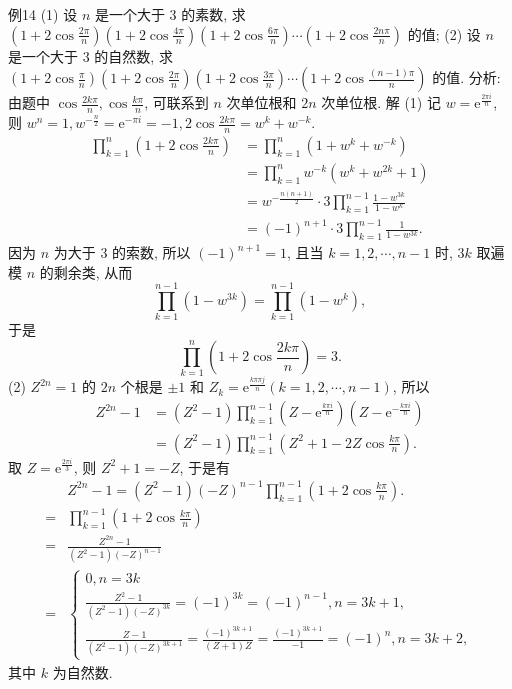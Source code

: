 例14 (1) 设 $n$ 是一个大于 3 的素数, 求 $\left(1+2 \cos \frac{2 \pi}{n}\right)\left(1+2 \cos \frac{4 \pi}{n}\right)\left(1+ 2 \cos \frac{6 \pi}{n}\right) \cdots\left(1+2 \cos \frac{2 n \pi}{n}\right)$ 的值;
(2) 设 $n$ 是一个大于 3 的自然数, 求 $\left(1+2 \cos \frac{\pi}{n}\right)\left(1+2 \cos \frac{2 \pi}{n}\right)\left(1+ 2 \cos \frac{3 \pi}{n}\right) \cdots\left(1+2 \cos \frac{(n-1) \pi}{n}\right)$ 的值.
分析:由题中 $\cos \frac{2 k \pi}{n}, \cos \frac{k \pi}{n}$, 可联系到 $n$ 次单位根和 $2 n$ 次单位根.
解 (1) 记 $w=\mathrm{e}^{\frac{2 \pi i}{n}}$, 则 $w^n=1, w^{-\frac{n}{2}}=\mathrm{e}^{-\pi i}=-1,2 \cos \frac{2 k \pi}{n}=w^k+w^{-k}$.
$$
\begin{aligned}
\prod_{k=1}^n\left(1+2 \cos \frac{2 k \pi}{n}\right) & =\prod_{k=1}^n\left(1+w^k+w^{-k}\right) \\
& =\prod_{k=1}^n w^{-k}\left(w^k+w^{2 k}+1\right) \\
& =w^{-\frac{n(n+1)}{2}} \cdot 3 \prod_{k=1}^{n-1} \frac{1-w^{3 k}}{1-w^k} \\
& =(-1)^{n+1} \cdot 3 \prod_{k=1}^{n-1} \frac{1}{1-w^{3 k}} .
\end{aligned}
$$
因为 $n$ 为大于 3 的索数, 所以 $(-1)^{n+1}=1$, 且当 $k=1,2, \cdots, n-1$ 时, $3 k$ 取遍模 $n$ 的剩余类, 从而
$$
\prod_{k=1}^{n-1}\left(1-w^{3 k}\right)=\prod_{k=1}^{n-1}\left(1-w^k\right),
$$
于是
$$
\prod_{k=1}^n\left(1+2 \cos \frac{2 k \pi}{n}\right)=3 .
$$
(2) $Z^{2 n}=1$ 的 $2 n$ 个根是 $\pm 1$ 和 $Z_k=\mathrm{e}^{\frac{k \pi \pi j}{n}}(k=1,2, \cdots, n-1)$, 所以
$$
\begin{aligned}
Z^{2 n}-1 & =\left(Z^2-1\right) \prod_{k=1}^{n-1}\left(Z-\mathrm{e}^{\frac{k \pi i}{n}}\right)\left(Z-\mathrm{e}^{-\frac{k \pi i}{n}}\right) \\
& =\left(Z^2-1\right) \prod_{k=1}^{n-1}\left(Z^2+1-2 Z \cos \frac{k \pi}{n}\right) .
\end{aligned}
$$
取 $Z=\mathrm{e}^{\frac{2 \pi i}{3}}$, 则 $Z^2+1=-Z$, 于是有
$$
\begin{aligned}
& Z^{2 n}-1=\left(Z^2-1\right)(-Z)^{n-1} \prod_{k=1}^{n-1}\left(1+2 \cos \frac{k \pi}{n}\right) . \\
= & \prod_{k=1}^{n-1}\left(1+2 \cos \frac{k \pi}{n}\right) \\
= & \frac{Z^{2 n}-1}{\left(Z^2-1\right)(-Z)^{n-1}} \\
= & \left\{\begin{array}{l}
0, n=3 k \\
\frac{Z^2-1}{\left(Z^2-1\right)(-Z)^{3 k}}=(-1)^{3 k}=(-1)^{n-1}, n=3 k+1, \\
\frac{Z-1}{\left(Z^2-1\right)(-Z)^{3 k+1}}=\frac{(-1)^{3 k+1}}{(Z+1) Z}=\frac{(-1)^{3 k+1}}{-1}=(-1)^n, n=3 k+2,
\end{array}\right.
\end{aligned}
$$
其中 $k$ 为自然数.



